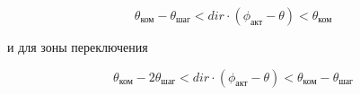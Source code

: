\begin{equation}
    \label{movement_zone_for_delta}
    \theta_\textit{ком} - \theta_\textit{шаг} < dir \cdot (\phi_\textit{акт} - \theta)
    < \theta_\textit{ком}
\end{equation}

и для зоны переключения

\begin{equation}
    \label{switch_zone_for_delta}
    \theta_\textit{ком} - 2\theta_\textit{шаг} < dir \cdot (\phi_\textit{акт} - \theta)
    < \theta_\textit{ком} - \theta_\textit{шаг}
\end{equation}
